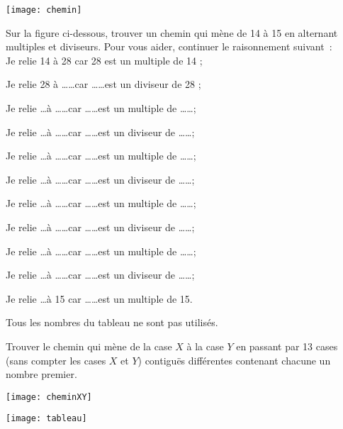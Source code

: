 \begin{exercice}
\begin{center} \texttt{[image: chemin]} \end{center}

Sur la figure ci-dessous, trouver un chemin qui mène de 14 à 15 en alternant multiples et diviseurs. Pour vous aider, continuer le raisonnement suivant : \\[1em]
Je relie 14 à 28 car 28 est un multiple de 14 ;

Je relie 28 à \ldots \ldots car \ldots \ldots est un diviseur de 28 ;

Je relie \ldots à \ldots \ldots car \ldots \ldots est un multiple de \ldots \ldots ;

Je relie \ldots à \ldots \ldots car \ldots \ldots est un diviseur de \ldots \ldots ;

Je relie \ldots à \ldots \ldots car \ldots \ldots est un multiple de \ldots \ldots ;

Je relie \ldots à \ldots \ldots car \ldots \ldots est un diviseur de \ldots \ldots ;

Je relie \ldots à \ldots \ldots car \ldots \ldots est un multiple de \ldots \ldots ;

Je relie \ldots à \ldots \ldots car \ldots \ldots est un diviseur de \ldots \ldots ;

Je relie \ldots à \ldots \ldots car \ldots \ldots est un multiple de \ldots \ldots ;

Je relie \ldots à \ldots \ldots car \ldots \ldots est un diviseur de \ldots \ldots ;

Je relie \ldots à 15 car \ldots \ldots est un multiple de 15.

Tous les nombres du tableau ne sont pas utilisés.

\end{exercice}



\newpage





\begin{exercice}
Trouver le chemin qui mène de la case $X$ à la case $Y$ en passant par 13 cases (sans compter les cases $X$ et $Y$) contiguës différentes contenant chacune un nombre premier.

\begin{center} \texttt{[image: cheminXY]} \end{center}

\begin{center} \texttt{[image: tableau]} \end{center}
\end{exercice}
